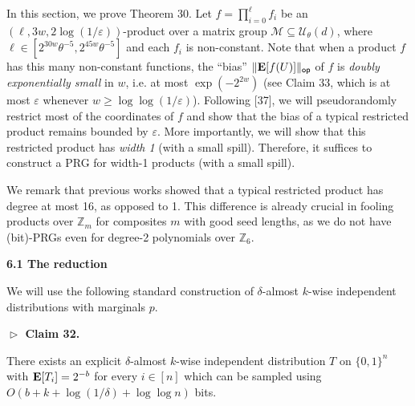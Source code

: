 In this section, we prove Theorem 30.
Let $f=\prod_{i=0}^{\ell}f_{i}$ be an $(\ell,3w,2\log(1/\varepsilon))$-product over a matrix group $\mathcal{M}\subseteq\mathcal{U}_{\theta}(d)$, where $\ell\in[2^{30w}\theta^{-5},2^{45w}\theta^{-5}]$ and each $f_{i}$ is non-constant.
Note that when a product $f$ has this many non-constant functions, the “bias” $\lVert\mathop{\bf E\/}[f(U)]\rVert_{\mathsf{op}}$ of $f$ is \emph{doubly exponentially small} in $w$, i.e. at most $\exp(-2^{2w})$ (see Claim 33, which is at most $\varepsilon$ whenever $w\geq\log\log(1/\varepsilon)$).
Following [37], we will pseudorandomly restrict most of the coordinates of $f$ and show that the bias of a typical restricted product remains bounded by $\varepsilon$.
More importantly, we will show that this restricted product has \emph{width 1} (with a small spill).
Therefore, it suffices to construct a PRG for width-1 products (with a small spill).\par




We remark that previous works showed that a typical restricted product has degree at most 16, as opposed to 1.
This difference is already crucial in fooling products over $\mathbb{Z}_{m}$ for composites $m$ with good seed lengths, as we do not have (bit)-PRGs even for degree-2 polynomials over $\mathbb{Z}_{6}$.\par




\par\medskip\noindent\textbf{
6.1 The reduction}\par




We will use the following standard construction of $\delta$-almost $k$-wise independent distributions with marginals $p$.\par





\par\medskip\noindent\textbf{
$\vartriangleright$ Claim 32. }\par



There exists an explicit $\delta$-almost $k$-wise independent distribution $T$ on $\{0,1\}^{n}$ with $\mathop{\bf E\/}[T_{i}]=2^{-b}$ for every $i\in[n]$ which can be sampled using $O(b+k+\log(1/\delta)+\log\log n)$ bits.\par



